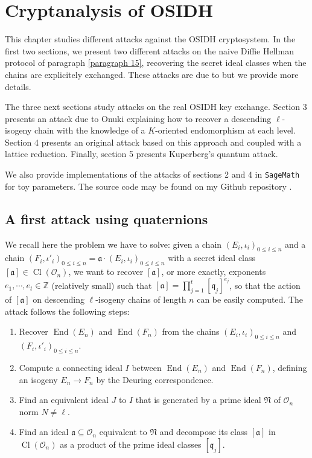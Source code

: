 \documentclass[a4paper,10pt]{report}
\theoremstyle{definition}
\theoremstyle{plain}
\theoremstyle{definition}
\newcommand{\Z}{\mathbb{Z}}
\newcommand{\mO}{\mathcal{O}}
\renewcommand{\(}{\left(}
\renewcommand{\)}{\right)}
\newcommand{\mf}[1]{\mathfrak{#1}}
\DeclareMathOperator{\End}{End}
\DeclareMathOperator{\Cl}{Cl}
\begin{document}
\chapter{Cryptanalysis of OSIDH}

This chapter studies different attacks against the OSIDH cryptosystem. In the first two sections, we present two different attacks on the naive Diffie Hellman protocol of paragraph \ref{paragraph 15}, recovering the secret ideal classes when the chains are explicitely exchanged. These attacks are due to \cite[§ 5.1]{OSIDH} but we provide more details. 

The three next sections study attacks on the real OSIDH key exchange. Section 3 presents an attack due to Onuki explaining how to recover a descending $\ell$-isogeny chain with the knowledge of a $K$-oriented endomorphism at each level. Section 4 presents an original attack based on this approach and coupled with a lattice reduction. Finally, section 5 presents Kuperberg's quantum attack.

We also provide implementations of the attacks of sections 2 and 4 in \verb?SageMath? \cite{sagemath} for toy parameters. The source code may be found on my Github repository \cite{MyGithub}.

\section{A first attack using quaternions}\label{paragraph 7}

We recall here the problem we have to solve: given a chain $(E_i,\iota_i)_{0\leq i\leq n}$ and a chain $(F_i,\iota'_i)_{0\leq i\leq n}=\mf{a}\cdot(E_i,\iota_i)_{0\leq i\leq n}$ with a secret ideal class $[\mf{a}]\in\Cl(\mO_n)$, we want to recover $[\mf{a}]$, or more exactly, exponents $e_1,\cdots, e_t\in\Z$ (relatively small) such that $[\mf{a}]=\prod_{j=1}^t[\mf{q}_j]^{e_j}$, so that the action of $[\mf{a}]$ on descending $\ell$-isogeny chains of length $n$ can be easily computed. The attack follows the following steps:
\begin{enumerate}
\item Recover $\End(E_n)$ and $\End(F_n)$ from the chains $(E_i,\iota_i)_{0\leq i\leq n}$ and $(F_i,\iota'_i)_{0\leq i\leq n}$.
\item Compute a connecting ideal $I$ between $\End(E_n)$ and $\End(F_n)$, defining an isogeny $E_n\longrightarrow F_n$ by the Deuring correspondence.
\item Find an equivalent ideal $J$ to $I$ that is generated by a prime ideal $\mf{N}$ of $\mO_n$ norm $N\neq\ell$.
\item Find an ideal $\mf{a}\subseteq \mO_n$ equivalent to $\mf{N}$ and decompose its class $[\mf{a}]$ in $\Cl(\mO_n)$ as a product of the prime ideal classes $[\mf{q}_j]$.
\end{enumerate}
\end{document}
